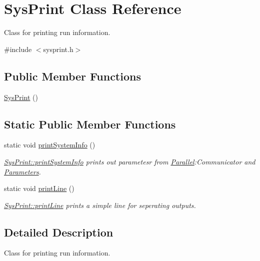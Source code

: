 \hypertarget{class_sys_print}{}\section{Sys\+Print Class Reference}
\label{class_sys_print}


Class for printing run information.  




{\ttfamily \#include $<$sysprint.\+h$>$}

\subsection*{Public Member Functions}
\begin{DoxyCompactItemize}
\item 
\mbox{\hyperlink{class_sys_print_a205d71843ed2243d76300df6b854bed8}{Sys\+Print}} ()
\end{DoxyCompactItemize}
\subsection*{Static Public Member Functions}
\begin{DoxyCompactItemize}
\item 
static void \mbox{\hyperlink{class_sys_print_a4572572643f6f4685081a3ae419e5ca9}{print\+System\+Info}} ()
\begin{DoxyCompactList}\small\item\em \mbox{\hyperlink{class_sys_print_a4572572643f6f4685081a3ae419e5ca9}{Sys\+Print\+::print\+System\+Info}} prints out parametesr from \mbox{\hyperlink{namespace_parallel}{Parallel}}\+:Communicator and \mbox{\hyperlink{class_parameters}{Parameters}}. \end{DoxyCompactList}\item 
static void \mbox{\hyperlink{class_sys_print_abdf8282e73cc002e5e572c6f09266cc9}{print\+Line}} ()
\begin{DoxyCompactList}\small\item\em \mbox{\hyperlink{class_sys_print_abdf8282e73cc002e5e572c6f09266cc9}{Sys\+Print\+::print\+Line}} prints a simple line for seperating outputs. \end{DoxyCompactList}\end{DoxyCompactItemize}


\subsection{Detailed Description}
Class for printing run information. 

